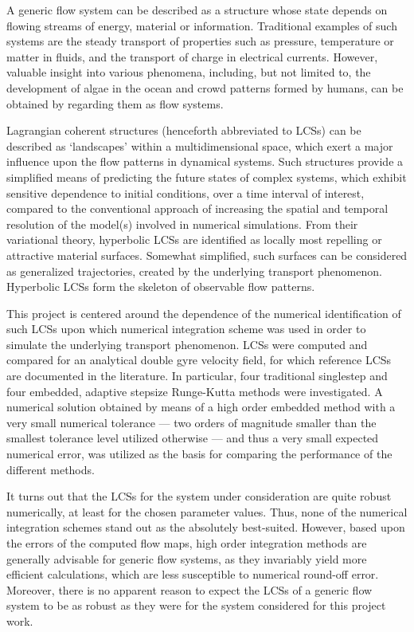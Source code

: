 A generic flow system can be described as a structure whose state depends on
flowing streams of energy, material or information. Traditional examples of
such systems are the steady transport of properties such as pressure,
temperature or matter in fluids, and the transport of charge in electrical
currents. However, valuable insight into various phenomena, including, but not
limited to, the development of algae in the ocean and crowd patterns formed
by humans, can be obtained by regarding them as flow systems.

Lagrangian coherent structures (henceforth abbreviated to LCSs) can be described
as `landscapes' within a multidimensional space, which exert a major influence
upon the flow patterns in dynamical systems. Such structures provide a
simplified means of predicting the future states of complex systems, which
exhibit sensitive dependence to initial conditions, over a time interval of
interest, compared to the conventional approach of increasing the spatial and
temporal resolution of the model(s) involved in numerical simulations. From
their variational theory, hyperbolic LCSs are identified as locally most
repelling or attractive material surfaces. Somewhat simplified, such surfaces
can be considered as generalized trajectories, created by the underlying
transport phenomenon. Hyperbolic LCSs form the skeleton of observable flow
patterns.

This project is centered around the dependence of the numerical identification
of such LCSs upon which numerical integration scheme was used in order to
simulate the underlying transport phenomenon.
LCSs were computed and compared for an analytical double gyre velocity
field, for which reference LCSs are documented in the literature. In particular,
four traditional singlestep and four embedded, adaptive stepsize Runge-Kutta
methods were investigated. A numerical solution obtained by means of a high
order embedded method with a very small numerical tolerance --- two orders of
magnitude smaller than the smallest tolerance level utilized otherwise ---
and thus a very small expected numerical error, was utilized as the basis
for comparing the performance of the different methods.

It turns out that the LCSs for the system under consideration are quite robust
numerically, at least for the chosen parameter values. Thus, none of the
numerical integration schemes stand out as the absolutely best-suited. However,
based upon the errors of the computed flow maps, high order integration
methods are generally advisable for generic flow systems, as they invariably
yield more efficient calculations, which are less susceptible to numerical
round-off error. Moreover, there is no apparent reason to expect the LCSs of
a generic flow system to be as robust as they were for the system considered
for this project work.

